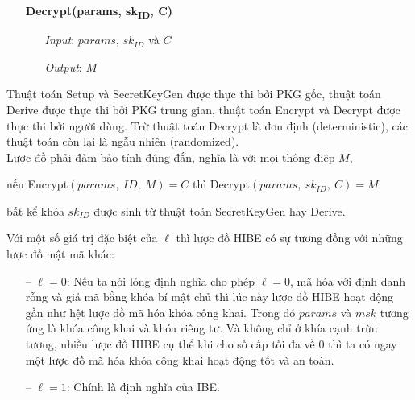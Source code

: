 \documentclass[class=report, crop=false]{standalone}
\begin{document}
\begin{definition}[HIBE]
\begin{itemize}
				\item[] {\sffamily\bfseries Decrypt(params, sk\textsubscript{ID}, C)}
				\begin{itemize}
					\item[\textbullet] \textit{Input}: $params$, $sk_{ID}$ và $C$
					\item[\textbullet] \textit{Output}: $M$
				\end{itemize}
			\end{itemize}
			\vspace{-\baselineskip}\indent\indent
			Thuật toán \textsf{Setup} và \textsf{SecretKeyGen} được thực thi bởi PKG gốc, thuật toán \textsf{Derive} được thực thi bởi PKG trung gian, thuật toán \textsf{Encrypt} và \textsf{Decrypt} được thực thi bởi người dùng. Trừ thuật toán \textsf{Decrypt} là đơn định (deterministic), các thuật toán còn lại là ngẫu nhiên (randomized). \\ \indent
			Lược đồ phải đảm bảo tính đúng đắn, nghĩa là với mọi thông điệp $M$,
			\vspace{-\baselineskip}
			\begin{center}
				nếu \hspace{1ex} \textsf{Encrypt}$(params,\ ID,\ M) = C$ \hspace{1ex} thì \hspace{1ex} \textsf{Decrypt}$(params,\ sk_{ID},\ C) = M$
			\end{center}
			\vspace{-\baselineskip}
			bất kể khóa $sk_{ID}$ được sinh từ thuật toán \textsf{SecretKeyGen} hay \textsf{Derive}.
		\end{definition}
		\begin{remark}
			Với một số giá trị đặc biệt của $\ell$ thì lược đồ HIBE có sự tương đồng với những lược đồ mật mã khác:
			\vspace{-0.5cm}
			\begin{itemize}
				\item[--] $\ell = 0$: Nếu ta nới lỏng định nghĩa cho phép $\ell = 0$, mã hóa với định danh rỗng và giả mã bằng khóa bí mật chủ thì lúc này lược đồ HIBE hoạt động gần như hệt lược đồ mã hóa khóa công khai. Trong đó $params$ và $msk$ tương ứng là khóa công khai và khóa riêng tư. Và không chỉ ở khía cạnh trừu tượng, nhiều lược đồ HIBE cụ thể khi cho số cấp tối đa về 0 thì ta có ngay một lược đồ mã hóa khóa công khai hoạt động tốt và an toàn.
				\item[--] $\ell = 1$: Chính là định nghĩa của IBE.
			\end{itemize}
		\end{remark}
\end{document}
